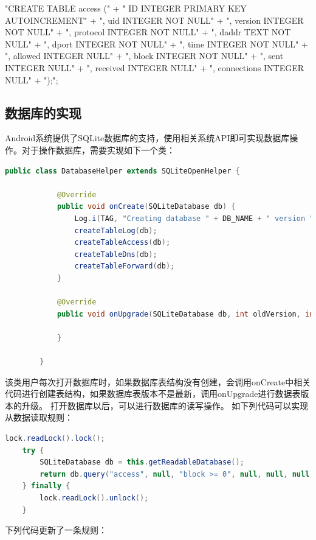 \documentclass[format=final, language=chinese, degree=fyp]{hustthesis}
\begin{document}
"CREATE TABLE access (" +
                " ID INTEGER PRIMARY KEY AUTOINCREMENT" +
                ", uid INTEGER NOT NULL" +
                ", version INTEGER NOT NULL" +
                ", protocol INTEGER NOT NULL" +
                ", daddr TEXT NOT NULL" +
                ", dport INTEGER NOT NULL" +
                ", time INTEGER NOT NULL" +
                ", allowed INTEGER NULL" +
                ", block INTEGER NOT NULL" +
                ", sent INTEGER NULL" +
                ", received INTEGER NULL" +
                ", connections INTEGER NULL" +
                ");";

\subsection{数据库的实现}

   Android系统提供了SQLite数据库的支持，使用相关系统API即可实现数据库操作。对于操作数据库，需要实现如下一个类：

\begin{lstlisting}[language=java]
        public class DatabaseHelper extends SQLiteOpenHelper {

            @Override
            public void onCreate(SQLiteDatabase db) {
                Log.i(TAG, "Creating database " + DB_NAME + " version " + DB_VERSION);
                createTableLog(db);
                createTableAccess(db);
                createTableDns(db);
                createTableForward(db);
            }

            @Override
            public void onUpgrade(SQLiteDatabase db, int oldVersion, int newVersion) {

            }

        }
\end{lstlisting}

   该类用户每次打开数据库时，如果数据库表结构没有创建，会调用onCreate中相关代码进行创建表结构，如果数据库表版本不是最新，调用onUpgrade进行数据表版本的升级。
   打开数据库以后，可以进行数据库的读写操作。
   如下列代码可以实现从数据读取规则：

\begin{lstlisting}[language=java]
    lock.readLock().lock();
    try {
        SQLiteDatabase db = this.getReadableDatabase();
        return db.query("access", null, "block >= 0", null, null, null, "uid");
    } finally {
        lock.readLock().unlock();
    }
\end{lstlisting}

   下列代码更新了一条规则：
\end{document}
